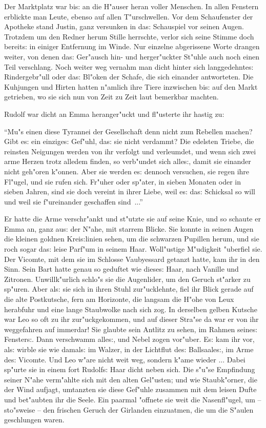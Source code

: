 \documentclass[oneside,12pt]{book}
\newcommand{\s}{s:}%
\begin{document}
Der Marktplatz war bi{\s} an die H"auser heran voller Menschen. In
allen Fenstern erblickte man Leute, ebenso auf allen
T"urschwellen. Vor dem Schaufenster der Apotheke stand Justin,
ganz versunken in da{\s} Schauspiel vor seinen Augen. Trotzdem um
den Redner herum Stille herrschte, verlor sich seine Stimme doch
bereit{\s} in einiger Entfernung im Winde. Nur einzelne
abgerissene Worte drangen weiter, von denen da{\s} Ger"ausch hin-
und herger"uckter St"uhle auch noch einen Teil verschlang. Noch
weiter weg vernahm man dicht hinter sich langgedehnte{\s}
Rindergebr"ull oder da{\s} Bl"oken der Schafe, die sich einander
antworteten. Die Kuhjungen und Hirten hatten n"amlich ihre Tiere
inzwischen bi{\s} auf den Markt getrieben, wo sie sich nun von
Zeit zu Zeit laut bemerkbar machten.

Rudolf war dicht an Emma heranger"uckt und fl"usterte ihr hastig
zu:

"`Mu"s einen diese Tyrannei der Gesellschaft denn nicht zum
Rebellen machen? Gibt e{\s} ein einzige{\s} Gef"uhl, da{\s} sie
nicht verdammt? Die edelsten Triebe, die reinsten Neigungen werden
von ihr verfolgt und verleumdet, und wenn sich zwei arme Herzen
trotz alledem finden, so verb"undet sich alle{\s}, damit sie
einander nicht geh"oren k"onnen. Aber sie werden e{\s} dennoch
versuchen, sie regen ihre Fl"ugel, und sie rufen sich. Fr"uher
oder sp"ater, in sieben Monaten oder in sieben Jahren, sind sie
doch vereint in ihrer Liebe, weil e{\s} da{\s} Schicksal so will
und weil sie f"ureinander geschaffen sind~..."'

Er hatte die Arme verschr"ankt und st"utzte sie auf seine Knie,
und so schaute er Emma an, ganz au{\s} der N"ahe, mit starrem
Blicke. Sie konnte in seinen Augen die kleinen goldnen
Krei{\s}linien sehen, um die schwarzen Pupillen herum, und sie
roch sogar da{\s} leise Parf"um in seinem Haar. Woll"ustige
M"udigkeit "uberfiel sie. Der Vicomte, mit dem sie im Schlosse
Vaubyessard getanzt hatte, kam ihr in den Sinn. Sein Bart hatte
genau so geduftet wie diese{\s} Haar, nach Vanille und Zitronen.
Unwillk"urlich schlo"s sie die Augenlider, um den Geruch st"arker
zu sp"uren. Aber al{\s} sie sich in ihren Stuhl zur"ucklehnte,
fiel ihr Blick gerade auf die alte Postkutsche, fern am Horizonte,
die langsam die H"ohe von Leux herabfuhr und eine lange Staubwolke
nach sich zog. In derselben gelben Kutsche war Leo so oft zu ihr
zur"uckgekommen, und auf dieser Stra"se da war er von ihr
weggefahren auf immerdar! Sie glaubte sein Antlitz zu sehen, im
Rahmen seine{\s} Fenster{\s}. Dann verschwamm alle{\s}, und Nebel
zogen vor"uber. E{\s} kam ihr vor, al{\s} wirble sie wie damal{\s}
im Walzer, in der Lichtflut de{\s} Ballsaale{\s}, im Arme de{\s}
Vicomte. Und Leo w"are nicht weit weg, sondern k"ame wieder ...
Dabei sp"urte sie in einem fort Rudolf{\s} Haar dicht neben sich.
Die s"u"se Empfindung seiner N"ahe verm"ahlte sich mit den alten
Gel"usten; und wie Staubk"orner, die der Wind aufjagt, umtanzten
sie diese Gef"uhle zusammen mit dem leisen Dufte und bet"aubten
ihr die Seele. Ein paarmal "offnete sie weit die Nasenfl"ugel, um
-- sto"sweise -- den frischen Geruch der Girlanden einzuatmen, die
um die S"aulen geschlungen waren.
\end{document}
